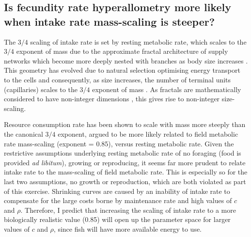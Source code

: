 \documentclass[a4paper]{article} %
\begin{document}
\subsection{Is fecundity rate hyperallometry more likely when intake rate mass-scaling is steeper?}

The $3/4$ scaling of intake rate is set by resting metabolic rate, which scales to the $3/4$ exponent of mass \autocite{Kleiber1947, peters1983, niklas1994plant} due to the approximate fractal architecture of supply networks which become more deeply nested with branches as body size increases \autocite{West1997}. This geometry has evolved due to natural selection optimising energy transport to the cells and consequently, as size increases, the number of terminal units (capillaries) scales to the $3/4$ exponent of mass \autocite{West1997, West2005}. As fractals are mathematically considered to have non-integer dimensions \autocite{Hausdorff1918, Mandelbrot1982}, this gives rise to non-integer size-scaling. 

Resource consumption rate has been shown to scale with mass more steeply than the canonical $3/4$ exponent, argued to be more likely related to field metabolic rate mass-scaling (exponent = 0.85), versus resting metabolic rate. Given the restrictive assumptions underlying resting metabolic rate of no foraging (food is provided \textit{ad libitum}), growing or reproducing, it seems far more prudent to relate intake rate to the mass-scaling of field metabolic rate. This is especially so for the last two assumptions, no growth or reproduction, which are both violated as part of this exercise. Shrinking curves are caused by an inability of intake rate to compensate for the large costs borne by maintenance rate and high values of $c$ and $\rho$. Therefore, I predict that increasing the scaling of intake rate to a more biologically realistic value (0.85) will open up the parameter space for larger values of $c$ and $\rho$, since fish will have more available energy to use.
\end{document}
